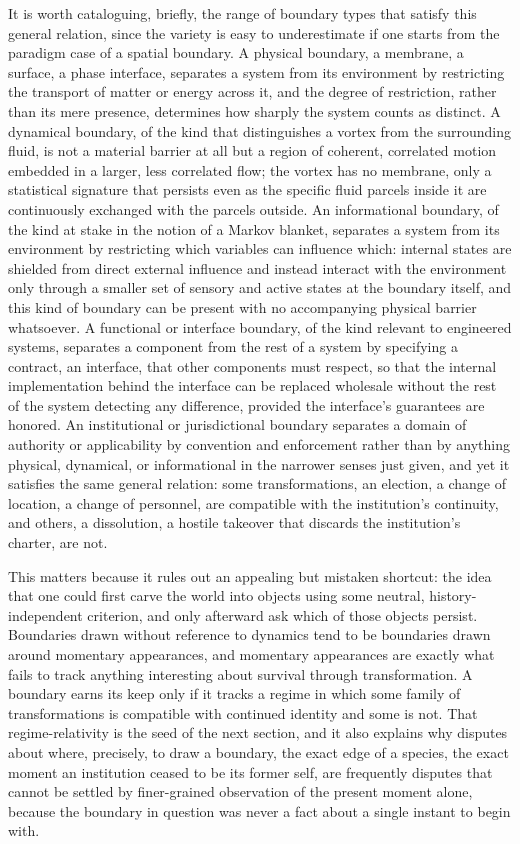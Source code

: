 \documentclass[11pt]{article}
\begin{document}
It is worth cataloguing, briefly, the range of boundary types that satisfy this general relation, since the variety is easy to underestimate if one starts from the paradigm case of a spatial boundary. A physical boundary, a membrane, a surface, a phase interface, separates a system from its environment by restricting the transport of matter or energy across it, and the degree of restriction, rather than its mere presence, determines how sharply the system counts as distinct. A dynamical boundary, of the kind that distinguishes a vortex from the surrounding fluid, is not a material barrier at all but a region of coherent, correlated motion embedded in a larger, less correlated flow; the vortex has no membrane, only a statistical signature that persists even as the specific fluid parcels inside it are continuously exchanged with the parcels outside. An informational boundary, of the kind at stake in the notion of a Markov blanket, separates a system from its environment by restricting which variables can influence which: internal states are shielded from direct external influence and instead interact with the environment only through a smaller set of sensory and active states at the boundary itself, and this kind of boundary can be present with no accompanying physical barrier whatsoever. A functional or interface boundary, of the kind relevant to engineered systems, separates a component from the rest of a system by specifying a contract, an interface, that other components must respect, so that the internal implementation behind the interface can be replaced wholesale without the rest of the system detecting any difference, provided the interface's guarantees are honored. An institutional or jurisdictional boundary separates a domain of authority or applicability by convention and enforcement rather than by anything physical, dynamical, or informational in the narrower senses just given, and yet it satisfies the same general relation: some transformations, an election, a change of location, a change of personnel, are compatible with the institution's continuity, and others, a dissolution, a hostile takeover that discards the institution's charter, are not.

This matters because it rules out an appealing but mistaken shortcut: the idea that one could first carve the world into objects using some neutral, history-independent criterion, and only afterward ask which of those objects persist. Boundaries drawn without reference to dynamics tend to be boundaries drawn around momentary appearances, and momentary appearances are exactly what fails to track anything interesting about survival through transformation. A boundary earns its keep only if it tracks a regime in which some family of transformations is compatible with continued identity and some is not. That regime-relativity is the seed of the next section, and it also explains why disputes about where, precisely, to draw a boundary, the exact edge of a species, the exact moment an institution ceased to be its former self, are frequently disputes that cannot be settled by finer-grained observation of the present moment alone, because the boundary in question was never a fact about a single instant to begin with.
\end{document}
